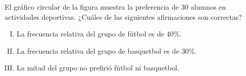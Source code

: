 El gráfico circular de la figura muestra la preferencia de 30 alumnos en actividades deportivas. ¿Cuáles de las siguientes afirmaciones son correctas?
\begin{center}
\end{center}

\begin{enumerate}[I.]
	\item La frecuencia relativa del grupo de fútbol es de 40\%.
	\item La frecuencia relativa del grupo de basquetbol es de 30\%.
	\item La mitad del grupo no prefirió fútbol ni basquetbol.
\end{enumerate}
